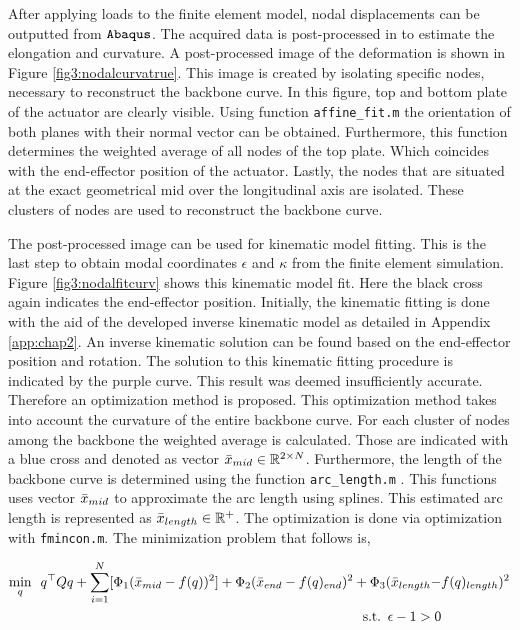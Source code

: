 After applying loads to the finite element model, nodal displacements can be outputted from $\verb+Abaqus+$. The acquired data is post-processed in \MATLAB to estimate the elongation and curvature. A post-processed image of the deformation is shown in Figure \ref{fig3:nodalcurvatrue}. This image is created by isolating specific nodes, necessary to reconstruct the backbone curve. In this figure, top and bottom plate of the actuator are clearly visible. Using \MATLAB function \verb+affine_fit.m+ \cite{affinefit} the orientation of both planes with their normal vector can be obtained. Furthermore, this function determines the weighted average of all nodes of the top plate. Which coincides with the end-effector position of the actuator. Lastly, the nodes that are situated at the exact geometrical mid over the longitudinal axis are isolated. These clusters of nodes are used to reconstruct the backbone curve. 


The post-processed image can be used for kinematic model fitting. This is the last step to obtain modal coordinates $\epsilon$ and $\kappa$ from the finite element simulation. Figure \ref{fig3:nodalfitcurv} shows this kinematic model fit. Here the black cross again indicates the end-effector position. Initially, the kinematic fitting is done with the aid of the developed inverse kinematic model as detailed in Appendix \ref{app:chap2}. An inverse kinematic solution can be found based on the end-effector position and rotation. The solution to this kinematic fitting procedure is indicated by the purple curve. This result was deemed insufficiently accurate. Therefore an optimization method is proposed. This optimization method takes into account the curvature of the entire backbone curve. For each cluster of nodes among the backbone the weighted average is calculated. Those are indicated with a blue cross and denoted as vector $\Bar{x}_{mid} \in \mathbb{R}^{2\times N}$. Furthermore, the length of the backbone curve is determined using the function \verb+arc_length.m+ \cite{arclength}. This functions uses vector $\Bar{x}_{mid}$ to approximate the arc length using splines. This estimated arc length is represented as  $\Bar{x}_{length} \in \mathbb{R}^+ $. The optimization is done via optimization with \verb+fmincon.m+. The minimization problem that follows is,


\begin{equation}
\begin{aligned}
\min_{q} \hspace{5pt}  q^\top Q q  + \sum_{i=1}^{N}[\Phi_1(\Bar{x}_{mid} - f(q))^2] +   \Phi_2(\Bar{x}_{end}  - f(q)_{end})^2 +  \Phi_3(\Bar{x}_{length} - & f(q)_{length})^2  \\ 
\text{s.t.} \hspace{5pt} \epsilon - 1 > 0
\end{aligned}
\label{eq3:optim}
\end{equation}


